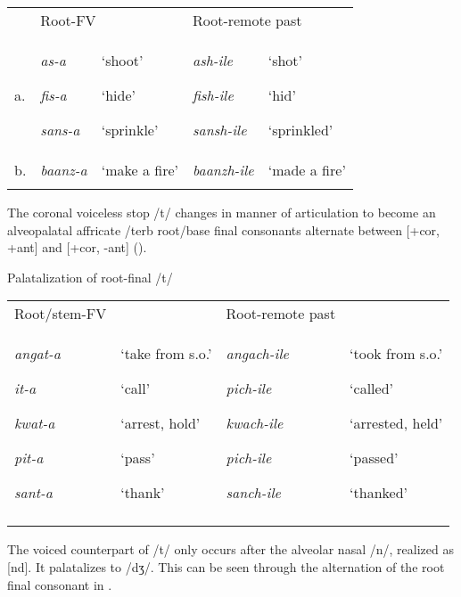 \documentclass[output=paper]{langsci/langscibook}
\begin{document}
\begin{tabularx}{\textwidth}{XXXXX} & \multicolumn{2}{l}{Root-FV} & \multicolumn{2}{l}{Root-remote past}\\
\lsptoprule
a. & {\emph{as-a}}

{\emph{fis-a}}

\emph{sans-a} & {‘shoot’}

{‘hide’}

‘sprinkle’ & {\emph{ash-ile}}

{\emph{fish-ile}}

\emph{sansh-ile} & {‘shot’}

{‘hid’}

‘sprinkled’\\
b. & \emph{baanz-a} & ‘make a fire’ & \emph{baanzh-ile} & ‘made a fire’\\
\lspbottomrule
\end{tabularx}
The coronal voiceless stop /t/ changes in manner of articulation to become an alveopalatal affricate /terb root/base final consonants alternate between [+cor, +ant] and [+cor, -ant] ().

\begin{table}
\caption{Palatalization of root-final /t/}
\label{tab:10}
\end{table}

\begin{tabularx}{\textwidth}{XXXX}
\lsptoprule
Root/stem-FV &  & Root-remote past & \\
{\emph{angat-a}}

{\emph{it-a}}

{\emph{kwat-a}}

{\emph{pit-a}}

\emph{sant-a} & {‘take from s.o.’}

{‘call’}

{‘arrest, hold’}

{‘pass’}

‘thank’ & {\emph{angach-ile}}

{\emph{pich-ile}}

{\emph{kwach-ile}}

{\emph{pich-ile }}

\emph{sanch-ile} & {‘took from s.o.’}

{‘called’}

{‘arrested, held’}

{‘passed’}

‘thanked’\\
\lspbottomrule
\end{tabularx}
The voiced counterpart of /t/ only occurs after the alveolar nasal /n/, realized as [nd]. It palatalizes to /dʒ/. This can be seen through the alternation of the root final consonant in .
\end{document}
